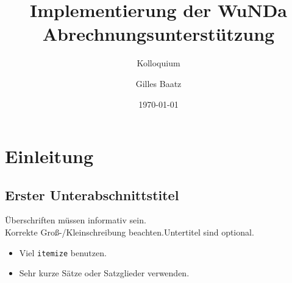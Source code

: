 \documentclass{beamer}
\title[Kurzversion des Titels] %
{Implementierung der WuNDa
Abrechnungsunterstützung}
\subtitle
{Kolloquium} %
\author{Gilles Baatz}
\institute[htw saar] %
{
  HTW des Saarlandes \newline Cismet
}
\date[Fach] %
{\today}
\begin{document}
\begin{frame}
  \titlepage
\end{frame}







\section{Einleitung}

\subsection[Kurzversion des ersten Unterabschnittstitels]
{Erster Unterabschnittstitel}

\begin{frame}{Überschriften müssen informativ sein.\\
    Korrekte Groß-/Kleinschreibung beachten.}{Untertitel sind optional.}

  \begin{itemize}
  \item
    Viel \texttt{itemize} benutzen.
  \item
    Sehr kurze Sätze oder Satzglieder verwenden.
  \end{itemize}
\end{frame}
\end{document}
